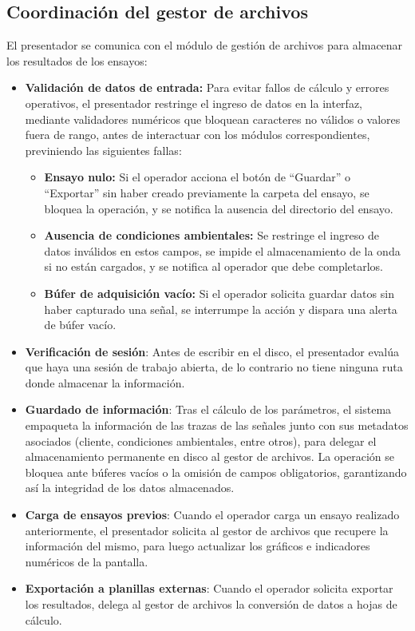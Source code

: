 \subsection{Coordinación del gestor de archivos}
\label{subsec:coordinacion_archivos}

El presentador se comunica con el módulo de gestión de archivos para almacenar los resultados de los ensayos:
\begin{itemize}
        \item \textbf{Validación de datos de entrada:} Para evitar fallos de cálculo y errores operativos, el presentador restringe el ingreso de datos en la interfaz, mediante validadores numéricos que bloquean caracteres no válidos o valores fuera de rango, antes de interactuar con los módulos correspondientes, previniendo las siguientes fallas:
        \begin{itemize}
            \item \textbf{Ensayo nulo:} Si el operador acciona el botón de \enquote{Guardar} o \enquote{Exportar} sin haber creado previamente la carpeta del ensayo, se bloquea la operación, y se notifica la ausencia del directorio del ensayo.
            \item \textbf{Ausencia de condiciones ambientales:} Se restringe el ingreso de datos inválidos en estos campos, se impide el almacenamiento de la onda si no están cargados, y se notifica al operador que debe completarlos.
            \item \textbf{Búfer de adquisición vacío:} Si el operador solicita guardar datos sin haber capturado una señal, se interrumpe la acción y dispara una alerta de búfer vacío.
        \end{itemize}
    \item \textbf{Verificación de sesión}: Antes de escribir en el disco, el presentador evalúa que haya una sesión de trabajo abierta, de lo contrario no tiene ninguna ruta donde almacenar la información.
    \item \textbf{Guardado de información}: Tras el cálculo de los parámetros, el sistema empaqueta la información de las trazas de las señales junto con sus metadatos asociados (cliente, condiciones ambientales, entre otros), para delegar el almacenamiento permanente en disco al gestor de archivos. La operación se bloquea ante búferes vacíos o la omisión de campos obligatorios, garantizando así la integridad de los datos almacenados.
    \item \textbf{Carga de ensayos previos}: Cuando el operador carga un ensayo realizado anteriormente, el presentador solicita al gestor de archivos que recupere la información del mismo, para luego actualizar los gráficos e indicadores numéricos de la pantalla.
    \item \textbf{Exportación a planillas externas}: Cuando el operador solicita exportar los resultados, delega al gestor de archivos la conversión de datos a hojas de cálculo.
\end{itemize}

